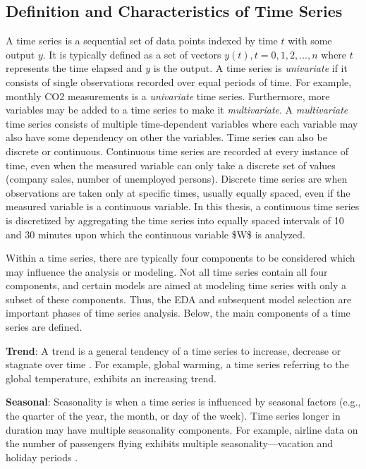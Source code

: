 \subsection{Definition and Characteristics of Time Series}

A time series is a sequential set of data points indexed by time $t$ with some output $y$. It is typically defined as a set of vectors $y(t), t = 0, 1, 2,. . .,n$ where $t$ represents the time elapsed and $y$ is the output. A time series is \textit{univariate} if it consists of single observations recorded over equal periods of time. For example, monthly CO2 measurements is a \textit{univariate} time series. Furthermore, more variables may be added to a time series to make it \textit{multivariate}. A \textit{multivariate} time series consists of multiple time-dependent variables where each variable may also have some dependency on other the variables. Time series can also be discrete or continuous. Continuous time series are recorded at every instance of time, even when the measured variable can only take a discrete set of values (company sales, number of unemployed persons). Discrete time series are when observations are taken only at specific times, usually equally spaced, even if the measured variable is a continuous variable. In this thesis, a continuous time series is discretized by aggregating the time series into equally spaced intervals of 10 and 30 minutes upon which the continuous variable \ac{$W$} is analyzed. 

Within a time series, there are typically four components to be considered which may influence the analysis or modeling. Not all time series contain all four components, and certain models are aimed at modeling time series with only a subset of these components. Thus, the EDA and subsequent model selection are important phases of time series analysis. Below, the main components of a time series are defined.

\textbf{Trend}: A trend is a general tendency of a time series to increase, decrease or stagnate over time \cite{tsa}. For example, global warming, a time series referring to the global temperature, exhibits an increasing trend. 

\textbf{Seasonal}: Seasonality is when a time series is influenced by seasonal factors (e.g., the quarter of the year, the month, or day of the week). Time series longer in duration may have multiple seasonality components. For example, airline data on the number of passengers flying exhibits multiple seasonality—vacation and holiday periods \cite{tsa}.

